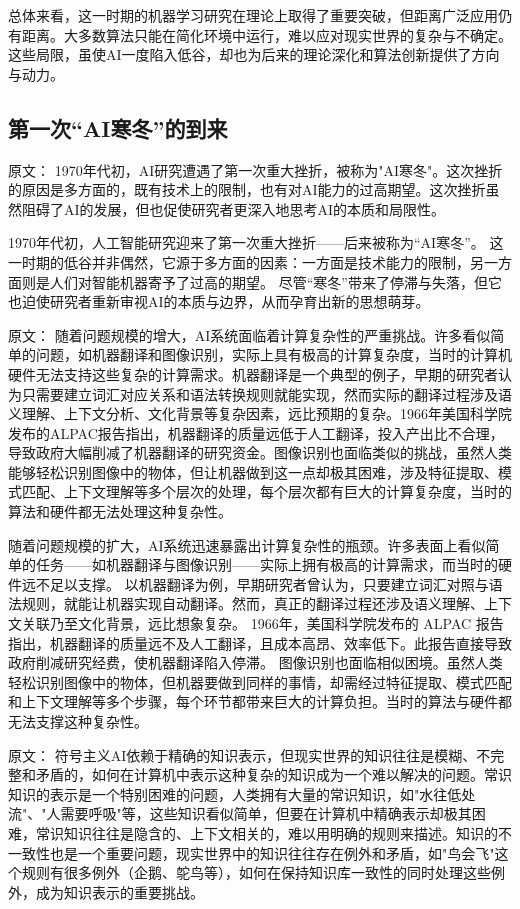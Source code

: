 总体来看，这一时期的机器学习研究在理论上取得了重要突破，但距离广泛应用仍有距离。大多数算法只能在简化环境中运行，难以应对现实世界的复杂与不确定。这些局限，虽使AI一度陷入低谷，却也为后来的理论深化和算法创新提供了方向与动力。

\subsection{第一次“AI寒冬”的到来}

原文：
1970年代初，AI研究遭遇了第一次重大挫折，被称为"AI寒冬"。这次挫折的原因是多方面的，既有技术上的限制，也有对AI能力的过高期望。这次挫折虽然阻碍了AI的发展，但也促使研究者更深入地思考AI的本质和局限性。

1970年代初，人工智能研究迎来了第一次重大挫折——后来被称为“AI寒冬”。  
这一时期的低谷并非偶然，它源于多方面的因素：一方面是技术能力的限制，另一方面则是人们对智能机器寄予了过高的期望。  
尽管“寒冬”带来了停滞与失落，但它也迫使研究者重新审视AI的本质与边界，从而孕育出新的思想萌芽。

原文：
随着问题规模的增大，AI系统面临着计算复杂性的严重挑战。许多看似简单的问题，如机器翻译和图像识别，实际上具有极高的计算复杂度，当时的计算机硬件无法支持这些复杂的计算需求。机器翻译是一个典型的例子，早期的研究者认为只需要建立词汇对应关系和语法转换规则就能实现，然而实际的翻译过程涉及语义理解、上下文分析、文化背景等复杂因素，远比预期的复杂。1966年美国科学院发布的ALPAC报告指出，机器翻译的质量远低于人工翻译，投入产出比不合理，导致政府大幅削减了机器翻译的研究资金。图像识别也面临类似的挑战，虽然人类能够轻松识别图像中的物体，但让机器做到这一点却极其困难，涉及特征提取、模式匹配、上下文理解等多个层次的处理，每个层次都有巨大的计算复杂度，当时的算法和硬件都无法处理这种复杂性。

随着问题规模的扩大，AI系统迅速暴露出计算复杂性的瓶颈。许多表面上看似简单的任务——如机器翻译与图像识别——实际上拥有极高的计算需求，而当时的硬件远不足以支撑。  
以机器翻译为例，早期研究者曾认为，只要建立词汇对照与语法规则，就能让机器实现自动翻译。然而，真正的翻译过程还涉及语义理解、上下文关联乃至文化背景，远比想象复杂。  
1966年，美国科学院发布的 ALPAC 报告指出，机器翻译的质量远不及人工翻译，且成本高昂、效率低下。此报告直接导致政府削减研究经费，使机器翻译陷入停滞。  
图像识别也面临相似困境。虽然人类轻松识别图像中的物体，但机器要做到同样的事情，却需经过特征提取、模式匹配和上下文理解等多个步骤，每个环节都带来巨大的计算负担。当时的算法与硬件都无法支撑这种复杂性。

原文：
符号主义AI依赖于精确的知识表示，但现实世界的知识往往是模糊、不完整和矛盾的，如何在计算机中表示这种复杂的知识成为一个难以解决的问题。常识知识的表示是一个特别困难的问题，人类拥有大量的常识知识，如"水往低处流"、"人需要呼吸"等，这些知识看似简单，但要在计算机中精确表示却极其困难，常识知识往往是隐含的、上下文相关的，难以用明确的规则来描述。知识的不一致性也是一个重要问题，现实世界中的知识往往存在例外和矛盾，如"鸟会飞"这个规则有很多例外（企鹅、鸵鸟等），如何在保持知识库一致性的同时处理这些例外，成为知识表示的重要挑战。

